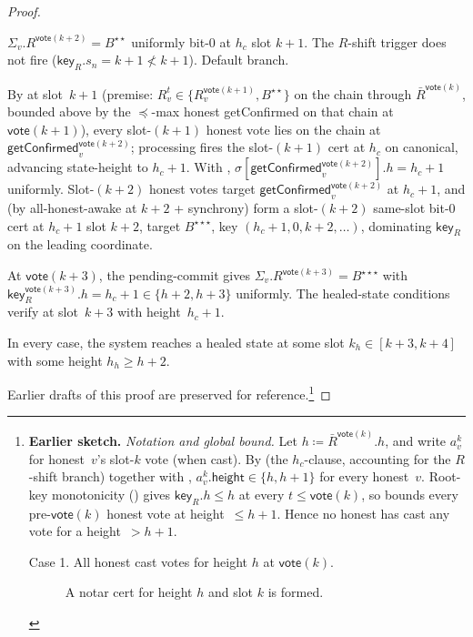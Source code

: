 \documentclass{article}
\newcommand{\height}{\mathsf{height}}
\newcommand{\key}{\mathsf{key}}
\newcommand{\vote}{\mathsf{vote}}
\newcommand{\comm}[1]{\bar{#1}}
\newcommand{\getConfirmed}{\textsf{getConfirmed}\xspace}
\theoremstyle{plain}
\theoremstyle{definition}
\theoremstyle{remark}
\newcommand{\AHA}{all-honest-awake\xspace}
\begin{document}
\begin{proof}
\begin{description}
\begin{description}
$\Sigma_v.R^{\vote(k+2)} = B^{\star\star}$ uniformly bit-$0$ at $h_c$ slot $k+1$. The $R$-shift trigger does not fire ($\key_R.s_n = k+1 \not< k+1$). Default branch.

By  at slot~$k+1$ (premise: $R_v^t \in \{R_v^{\vote(k+1)}, B^{\star\star}\}$ on the chain through $\comm{R}^{\vote(k)}$, bounded above by the $\preceq$-max honest \getConfirmed{} on that chain at $\vote(k+1)$), every slot-$(k+1)$ honest vote lies on the chain at $\getConfirmed_v^{\vote(k+2)}$; processing fires the slot-$(k+1)$ cert at $h_c$ on canonical, advancing state-height to $h_c + 1$. With , $\sigma[\getConfirmed_v^{\vote(k+2)}].h = h_c + 1$ uniformly. Slot-$(k+2)$ honest votes target $\getConfirmed_v^{\vote(k+2)}$ at $h_c + 1$, and (by \AHA at $k+2$ + synchrony) form a slot-$(k+2)$ same-slot bit-$0$ cert at $h_c + 1$ slot $k+2$, target $B^{\star\star\star}$, key $(h_c+1, 0, k+2, \ldots)$, dominating $\key_R$ on the leading coordinate.

At $\vote(k+3)$, the pending-commit gives $\Sigma_v.R^{\vote(k+3)} = B^{\star\star\star}$ with $\key_R^{\vote(k+3)}.h = h_c + 1 \in \{h+2, h+3\}$ uniformly. The healed-state conditions verify at slot~$k+3$ with height~$h_c + 1$.
\end{description}
\end{description}

In every case, the system reaches a healed state at some slot $k_h \in [k+3, k+4]$ with some height $h_h \geq h+2$.

\noindent Earlier drafts of this proof are preserved for reference.\footnote{\textbf{Earlier sketch.} \emph{Notation and global bound.}
Let $h \coloneqq \comm{R}^{\vote(k)}.h$, and write $a^k_v$ for honest~$v$'s slot-$k$ vote (when cast). By  (the $h_c$-clause, accounting for the $R$-shift branch) together with , $a^k_v.\height \in \{h, h+1\}$ for every honest~$v$. Root-key monotonicity () gives $\key_R.h \leq h$ at every $t \leq \vote(k)$, so  bounds every pre-$\vote(k)$ honest vote at height~$\leq h+1$. Hence no honest has cast any vote for a height~$> h+1$.

\begin{description}
  \item[Case 1. All honest cast votes for height $h$ at $\vote(k)$.]
  A notar cert for height $h$ and slot $k$ is formed.
  

\end{description}}
\end{proof}
\end{document}
